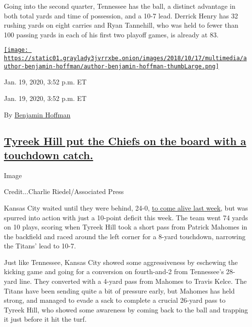 Going into the second quarter, Tennessee has the ball, a distinct
advantage in both total yards and time of possession, and a 10-7 lead.
Derrick Henry has 32 rushing yards on eight carries and Ryan Tannehill,
who was held to fewer than 100 passing yards in each of his first two
playoff games, is already at 83.

\href{https://www.nytimes3xbfgragh.onion/by/benjamin-hoffman}{\texttt{[image: https://static01.graylady3jvrrxbe.onion/images/2018/10/17/multimedia/author-benjamin-hoffman/author-benjamin-hoffman-thumbLarge.png]}}

Jan. 19, 2020, 3:52 p.m. ET

Jan. 19, 2020, 3:52 p.m. ET

By
\href{https://www.nytimes3xbfgragh.onion/by/benjamin-hoffman}{Benjamin
Hoffman}

\hypertarget{tyreek-hill-put-the-chiefs-on-the-board-with-a-touchdown-catch}{%
\subsection{\texorpdfstring{\protect\hyperlink{tyreek-hill-put-the-chiefs-on-the-board-with-a-touchdown-catch}{Tyreek
Hill put the Chiefs on the board with a touchdown
catch.}}{Tyreek Hill put the Chiefs on the board with a touchdown catch.}}\label{tyreek-hill-put-the-chiefs-on-the-board-with-a-touchdown-catch}}

Image

Credit...Charlie Riedel/Associated Press

Kansas City waited until they were behind, 24-0,
\href{https://www.nytimes3xbfgragh.onion/2020/01/12/sports/football/chiefs-texans.html}{to
come alive last week}, but was spurred into action with just a 10-point
deficit this week. The team went 74 yards on 10 plays, scoring when
Tyreek Hill took a short pass from Patrick Mahomes in the backfield and
raced around the left corner for a 8-yard touchdown, narrowing the
Titans' lead to 10-7.

Just like Tennessee, Kansas City showed some aggressiveness by eschewing
the kicking game and going for a conversion on fourth-and-2 from
Tennessee's 28-yard line. They converted with a 4-yard pass from Mahomes
to Travis Kelce. The Titans have been sending quite a bit of pressure
early, but Mahomes has held strong, and managed to evade a sack to
complete a crucial 26-yard pass to Tyreek Hill, who showed some
awareness by coming back to the ball and trapping it just before it hit
the turf.


